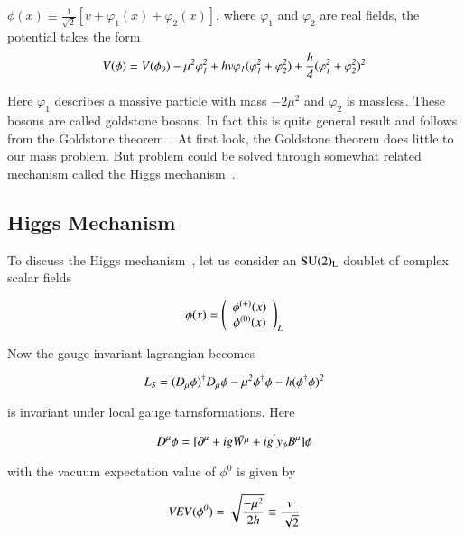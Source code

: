  

$\phi(x) \equiv \frac{1}{\sqrt{2}}[v+\varphi_{1}(x)+ \varphi_{2}(x)]$, where $\varphi_{1}$ and $\varphi_{2}$ are real fields, the potential takes the form 
\begin{align} \label{VafterPar}
\it V(\phi) = V(\phi_{0}) - \mu^{2}\varphi_{1}^{2} + hv\varphi_{1}(\varphi_{1}^{2} + \varphi_{2}^{2}) + \frac{h}{4}(\varphi_{1}^{2} + \varphi_{2}^{2})^{2}
\end{align}


Here $\varphi_{1}$ describes a massive particle with mass $-2\mu^{2}$ and $\varphi_{2}$ is massless. These bosons are called goldstone bosons. In fact this is quite general result and follows from the Goldstone theorem~\cite{GSW}. At first look, the Goldstone theorem does little to our mass problem. But problem could be solved through somewhat related mechanism called the Higgs mechanism~\cite{higgs}.


\subsection{Higgs Mechanism}
To discuss the Higgs mechanism~\cite{higgs}, let us consider an $\rm SU(2)_{L}$ doublet of complex scalar fields

\begin{equation} \label{eq1}
\it \phi(x) = \left( \begin{array}{cc} \phi^{(+)}(x)  \\ \phi^{(0)}(x)  \end{array} \right)_{L}
\end{equation}

 Now the gauge invariant lagrangian   becomes 

\begin{equation} \label{eq2HM}
\it L_{S} = (D_{\mu}\phi)^{\dagger} D_{\mu}\phi - \mu^{2}\phi^{\dagger}\phi - h(\phi^{\dagger}\phi)^{2} 
\end{equation}

is invariant under local gauge tarnsformations. Here
 
\begin{equation} \label{eq3HM}
\it D^{\mu}\phi =  [\partial^{\mu} + ig\bar{W^{\mu}} + ig^{'}y_{\phi}B^{\mu}]\phi 
\end{equation}

with the vacuum expectation value of $\phi^{0}$ is given by

\begin{equation} \label{VEVHM}
\it VEV(\phi^{0}) = \sqrt{\frac{-\mu^{2}}{2h}} \equiv \frac{v}{\sqrt{2}} 
\end{equation}


